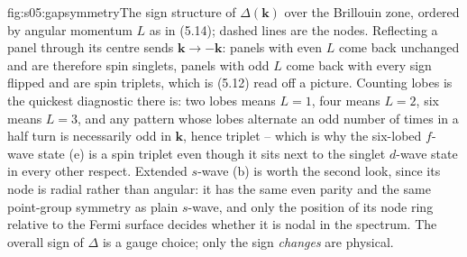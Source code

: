 %
\begin{aqmfigure}{fig:s05:gapsymmetry}{The sign structure of $\Delta(\mathbf k)$ over the Brillouin
zone, ordered by angular momentum $L$ as in (5.14); dashed lines are the nodes. Reflecting a panel
through its centre sends $\mathbf k\to-\mathbf k$: panels with even $L$ come back unchanged and are
therefore spin singlets, panels with odd $L$ come back with every sign flipped and are spin
triplets, which is (5.12) read off a picture. Counting lobes is the quickest diagnostic there is:
two lobes means $L=1$, four means $L=2$, six means $L=3$, and any pattern whose lobes alternate an
odd number of times in a half turn is necessarily odd in $\mathbf k$, hence triplet -- which is why
the six-lobed $f$-wave state (e) is a spin triplet even though it sits next to the singlet
$d$-wave state in every other respect. Extended $s$-wave (b) is worth the second look, since its node is radial rather than
angular: it has the same even parity and the same point-group symmetry as plain $s$-wave, and only
the position of its node ring relative to the Fermi surface decides whether it is nodal in the
spectrum. The overall sign of $\Delta$ is a gauge choice; only the sign \emph{changes} are physical.}

\end{aqmfigure}

